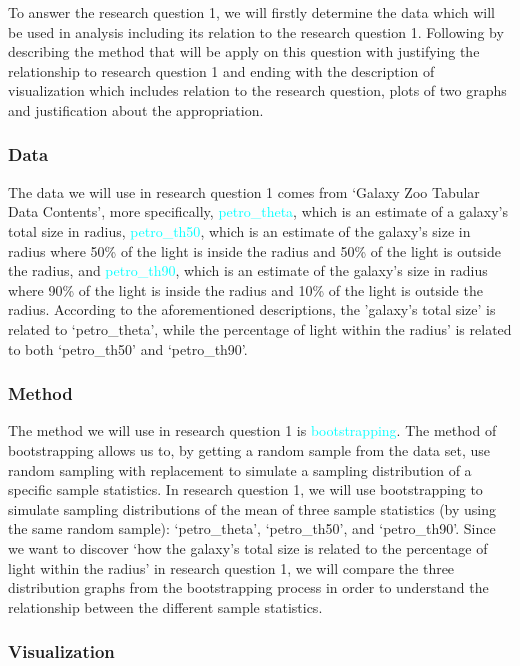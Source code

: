 \documentclass[12pt]{article}
\begin{document}
To answer the research question 1, we will firstly determine the data which will be used in analysis including its relation to the research question 1. Following by describing the method that will be apply on this question with justifying the relationship to research question 1 and ending with the description of visualization which includes relation to the research question, plots of two graphs and justification about the appropriation. 


\subsubsection{Data}

The data we will use in research question 1 comes from `Galaxy Zoo Tabular Data Contents', more specifically, \textcolor{cyan}{petro\_theta}, which is an estimate of a galaxy's total size in radius, \textcolor{cyan}{petro\_th50}, which is an estimate of the galaxy's size in radius where 50\% of the light is inside the radius and 50\% of the light is outside the radius, and \textcolor{cyan}{petro\_th90}, which is an estimate of the galaxy's size in radius where 90\% of the light is inside the radius and 10\% of the light is outside the radius. According to the aforementioned descriptions, the 'galaxy's total size' is related to `petro\_theta', while the percentage of light within the radius' is related to both `petro\_th50' and `petro\_th90'. 

\subsubsection{Method}

The method we will use in research question 1 is \textcolor{cyan}{bootstrapping}. The method of bootstrapping allows us to, by getting a random sample from the data set, use random sampling with replacement to simulate a sampling distribution of a specific sample statistics. In research question 1, we will use bootstrapping to simulate sampling distributions of the mean of three sample statistics (by using the same random sample): `petro\_theta', `petro\_th50', and `petro\_th90'. Since we want to discover `how the galaxy's total size is related to the percentage of light within the radius' in research question 1, we will compare the three distribution graphs from the bootstrapping process in order to understand the relationship between the different sample statistics. 

\subsubsection{Visualization}
\end{document}
